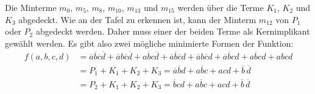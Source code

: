 Die Minterme $m_0$, $m_5$, $m_8$, $m_{10}$, $m_{13}$ und $m_{15}$ werden über die Terme $K_1$, $K_2$ und $K_3$ abgedeckt. Wie an der Tafel zu erkennen ist, kann der Minterm $m_{12}$ von $P_1$ oder $P_2$ abgedeckt werden. Daher muss einer der beiden Terme als Kernimplikant gewählt werden. Es gibt also zwei mögliche minimierte Formen der Funktion:
\begin{align*}
	f(a,b,c,d) &= \overline{a}\overline{b}\overline{c}\overline{d} + \overline{a}b\overline{c}\overline{d} 
	              + a\overline{b}c\overline{d} + \overline{a}\overline{b}\overline{c}d + \overline{a}b\overline{c}d 
	              + \overline{a}\overline{b}cd + a\overline{b}cd + abcd \\
	           &= P_1 + K_1 + K_2 + K_3 = \overline{a}\overline{b}d + a\overline{b}c + acd + \overline{b}\hspace{2pt}\overline{d} \\
	           &= P_2 + K_1 + K_2 + K_3 = \overline{b}cd + a\overline{b}c + acd + \overline{b}\hspace{2pt}\overline{d} \\
\end{align*}








